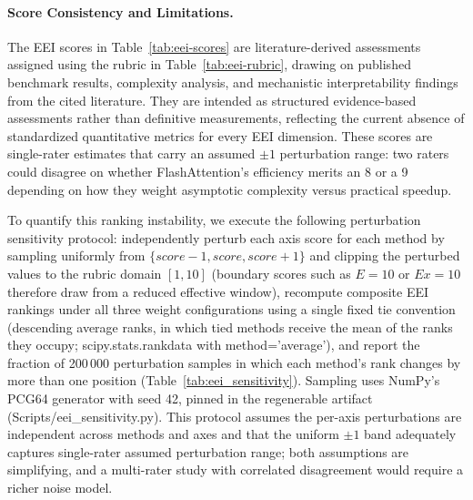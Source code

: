 \documentclass[10pt,twocolumn]{article}
\begin{document}
\paragraph{Score Consistency and Limitations.}
The EEI scores in Table~\ref{tab:eei-scores} are literature-derived assessments assigned using the rubric in Table~\ref{tab:eei-rubric}, drawing on published benchmark results, complexity analysis, and mechanistic interpretability findings from the cited literature. They are intended as structured evidence-based assessments rather than definitive measurements, reflecting the current absence of standardized quantitative metrics for every EEI dimension. These scores are single-rater estimates that carry an assumed $\pm1$ perturbation range: two raters could disagree on whether FlashAttention's efficiency merits an 8 or a 9 depending on how they weight asymptotic complexity versus practical speedup.

To quantify this ranking instability, we execute the following perturbation sensitivity protocol: independently perturb each axis score for each method by sampling uniformly from $\{\mathit{score}-1, \mathit{score}, \mathit{score}+1\}$ and clipping the perturbed values to the rubric domain $[1,10]$ (boundary scores such as $E=10$ or $\mathit{Ex}=10$ therefore draw from a reduced effective window), recompute composite EEI rankings under all three weight configurations using a single fixed tie convention (descending average ranks, in which tied methods receive the mean of the ranks they occupy; scipy.stats.rankdata with method='average'), and report the fraction of 200\,000 perturbation samples in which each method's rank changes by more than one position (Table~\ref{tab:eei_sensitivity}). Sampling uses NumPy's PCG64 generator with seed 42, pinned in the regenerable artifact (Scripts/eei\_sensitivity.py). This protocol assumes the per-axis perturbations are independent across methods and axes and that the uniform $\pm1$ band adequately captures single-rater assumed perturbation range; both assumptions are simplifying, and a multi-rater study with correlated disagreement would require a richer noise model.
\end{document}
